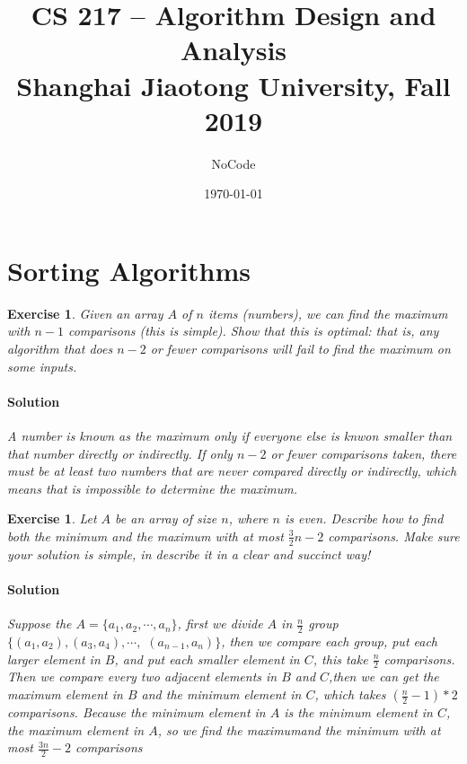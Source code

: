 \documentclass[12pt,a4]{article}
\newtheorem{exercise}[theorem]{Exercise}
\begin{document}
\author{NoCode}
\date{\today}

\title{CS 217 -- Algorithm Design and Analysis \\ 
  \vspace{3mm}
{\large	Shanghai Jiaotong University, Fall 2019\\
}
}
\maketitle



\setcounter{section}{1}


\section{Sorting Algorithms}

\begin{exercise}
   Given an array $A$ of $n$ items (numbers), we can find the maximum with $n-1$ comparisons (this is simple).
   Show that this is optimal: that is, any algorithm that does $n-2$ or fewer comparisons will fail to find the maximum 
   on some inputs.
   
   \paragraph{Solution}
  A number is known as the maximum only if everyone else is knwon smaller than that number directly or indirectly. If only $n-2$ or fewer comparisons taken, there must be at least two numbers that are never compared directly or indirectly, which means that is impossible to determine the maximum.
\end{exercise}

\begin{exercise}
  Let $A$ be an array of size $n$, where $n$ is even. 
  Describe how to find both the minimum and the maximum
  with at most $\frac{3}{2} n  - 2$ comparisons.
  Make sure your solution is {\em simple}, in describe it 
  in a clear and succinct way!
  \paragraph{Solution}
    Suppose the $A = \{a_1, a_2, \cdots, a_n\}$, first we divide $A$ in $\frac n 2$ group $\{(a_1,a_2), (a_3, a_4), \cdots,$
    $ (a_{n-1}, a_{n})\}$, then we
    compare each group, put each larger element in $B$, and put each smaller element in $C$, this take $\frac n 2$ comparisons. Then we compare every two adjacent elements 
    in $B$ and $C$,then we can get the maximum element in $B$ and the minimum element in $C$, which takes $(\frac n 2 -1)*2$ comparisons. Because 
    the minimum element in $A$ is the minimum element in $C$, the maximum element in $A$, so we find the maximumand the minimum with at most $\frac {3n}{2} -2$ comparisons
\end{exercise}
\end{document}
